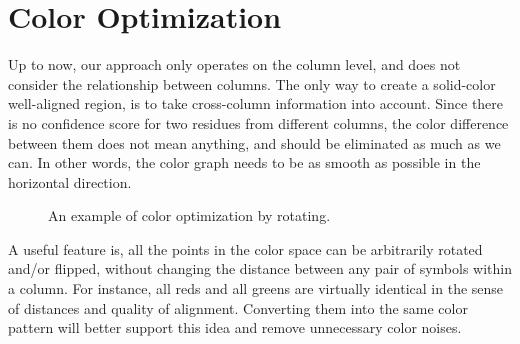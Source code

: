 \section{Color Optimization}

Up to now, our approach only operates on the column level, and does not consider the relationship between columns. The only way to create a solid-color well-aligned region, is to take cross-column information into account. Since there is no confidence score for two residues from different columns, the color difference between them does not mean anything, and should be eliminated as much as we can. In other words, the color graph needs to be as smooth as possible in the horizontal direction.

\begin{figure}[hbt]
\caption[Color Optimization by Rotation]{An example of color optimization by rotating.}\label{fig:chap2_rotate}
\end{figure}

A useful feature is, all the points in the color space can be arbitrarily rotated and/or flipped, without changing the distance between any pair of symbols within a column. For instance, all reds and all greens are virtually identical in the sense of distances and quality of alignment. Converting them into the same color pattern will better support this idea and remove unnecessary color noises.

